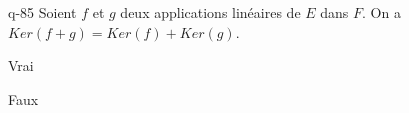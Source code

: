\begin{truefalse}{q-85}
Soient $f$ et $g$ deux applications linéaires de $E$ dans $F$. On a $Ker(f+g)=Ker(f)+Ker(g)$.
\item Vrai
\item* Faux
\end{truefalse}

